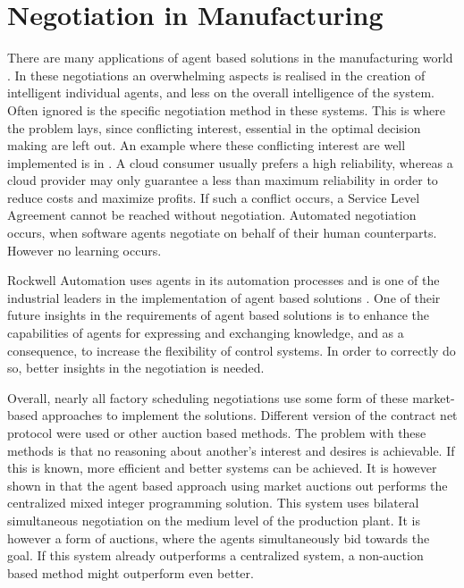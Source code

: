 \section{Negotiation in Manufacturing}
There are many applications of agent based solutions in the manufacturing world \citep{monostori2006agent}. In these negotiations an overwhelming aspects is realised in the creation of intelligent individual agents, and less on the overall intelligence of the system. Often ignored is the specific negotiation method in these systems. This is where the problem lays, since conflicting interest, essential in the optimal decision making are left out. An example where these conflicting interest are well implemented is in \citet{zheng2014cloud}. A cloud consumer usually prefers a high reliability, whereas a cloud provider may only guarantee a less than maximum reliability in order to reduce costs and maximize profits. If such a conflict occurs, a Service Level Agreement cannot be reached without negotiation. Automated negotiation occurs, when software agents negotiate on behalf of their human counterparts. However no learning occurs. 


Rockwell Automation uses agents in its automation processes and is one of the industrial leaders in the implementation of agent based solutions \citep{vrba2011rockwell}. One of their future insights in the requirements of agent based solutions is to enhance the capabilities of agents for expressing and exchanging knowledge, and as a consequence, to increase the flexibility of control systems. In order to correctly do so, better insights in the negotiation is needed.

Overall, nearly all factory scheduling negotiations use some form of these market-based approaches \citep{monostori2006agent} to implement the solutions. Different version of the contract net protocol were used or other auction based methods. The problem with these methods is that no reasoning about another's interest and desires is achievable. If this is known, more efficient and better systems can be achieved. It is however shown in \citet{bruccoleri2005production} that the agent based approach using market auctions out performs the centralized mixed integer programming solution. This system uses bilateral simultaneous negotiation on the medium level of the production plant. It is however a form of auctions, where the agents simultaneously bid towards the goal. If this system already outperforms a centralized system, a non-auction based method might outperform even better.

